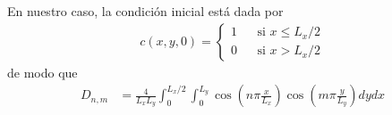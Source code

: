 \documentclass{article}
\begin{document}
  En nuestro caso, la condición inicial está dada por 
  \begin{align}
    \label{equation:initialCondition}
    c(x, y, 0)
    =
    \left\{
      \begin{aligned}
        1 &&\text{si } x \leq L_x /2 \\
        0 &&\text{si } x > L_x / 2
      \end{aligned}
    \right.
  \end{align}
  de modo que
  \begin{align}
    D_{n, m}
    &=
    \frac{4}{L_x L_y} 
    \int_0^{L_x / 2}
      \int_0^{L_y}
        \cos\left( n \pi \frac{x}{L_x} \right)
        \cos\left( m \pi \frac{y}{L_y} \right)
      d y
    d x
  \end{align}
  
\end{document}
